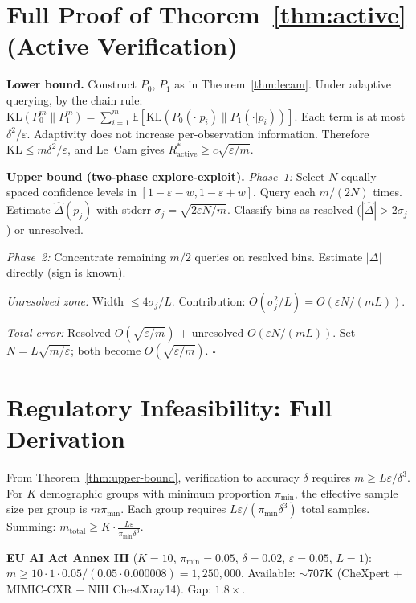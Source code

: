 \documentclass{article}
\newcommand{\Lip}{L}
\newcommand{\errrate}{\varepsilon}
\newcommand{\nsamples}{m}
\newcommand{\calmap}{\Delta}
\providecommand{\E}{}
\renewcommand{\E}{\mathbb{E}}
\providecommand{\KL}{}
\renewcommand{\KL}{\mathrm{KL}}
\newcommand{\activeR}{R^*_{\mathrm{active}}}
\newcommand{\groupprop}{\pi}
\newcommand{\targetacc}{\delta}
\theoremstyle{definition}
\begin{document}
\section{Full Proof of Theorem~\ref{thm:active} (Active Verification)}
\label{app:active-proof}

\textbf{Lower bound.} Construct $P_0$, $P_1$ as in Theorem~\ref{thm:lecam}. Under adaptive querying, by the chain rule:
$\KL(P_0^\nsamples \| P_1^\nsamples) = \sum_{i=1}^\nsamples \E[\KL(P_0(\cdot|p_i) \| P_1(\cdot|p_i))]$.
Each term is at most $\targetacc^2/\errrate$. Adaptivity does not increase per-observation information. Therefore $\KL \leq \nsamples\targetacc^2/\errrate$, and Le~Cam gives $\activeR \geq c\sqrt{\errrate/\nsamples}$.

\textbf{Upper bound (two-phase explore-exploit).}
\emph{Phase~1:} Select $N$ equally-spaced confidence levels in $[1{-}\errrate{-}w, 1{-}\errrate{+}w]$. Query each $\nsamples/(2N)$ times. Estimate $\hat\calmap(p_j)$ with stderr $\sigma_j = \sqrt{2\errrate N/\nsamples}$. Classify bins as resolved ($|\hat\calmap| > 2\sigma_j$) or unresolved.

\emph{Phase~2:} Concentrate remaining $\nsamples/2$ queries on resolved bins. Estimate $|\calmap|$ directly (sign is known).

\emph{Unresolved zone:} Width $\leq 4\sigma_j/\Lip$. Contribution: $O(\sigma_j^2/\Lip) = O(\errrate N/(\nsamples\Lip))$.

\emph{Total error:} Resolved $O(\sqrt{\errrate/\nsamples})$ + unresolved $O(\errrate N/(\nsamples\Lip))$. Set $N = \Lip\sqrt{\nsamples/\errrate}$; both become $O(\sqrt{\errrate/\nsamples})$. $\square$

\section{Regulatory Infeasibility: Full Derivation}
\label{app:regulatory}

From Theorem~\ref{thm:upper-bound}, verification to accuracy $\targetacc$ requires $\nsamples \geq \Lip\errrate/\targetacc^3$. For $K$ demographic groups with minimum proportion $\groupprop_{\min}$, the effective sample size per group is $\nsamples\groupprop_{\min}$. Each group requires $\Lip\errrate/(\groupprop_{\min}\targetacc^3)$ total samples. Summing:
$\nsamples_{\mathrm{total}} \geq K \cdot \frac{\Lip\errrate}{\groupprop_{\min}\targetacc^3}$.

\textbf{EU AI Act Annex III} ($K{=}10$, $\groupprop_{\min}{=}0.05$, $\targetacc{=}0.02$, $\errrate{=}0.05$, $\Lip{=}1$): $\nsamples \geq 10 \cdot 1 \cdot 0.05 / (0.05 \cdot 0.000008) = 1{,}250{,}000$. Available: $\sim$707K (CheXpert + MIMIC-CXR + NIH ChestXray14). Gap: $1.8\times$.
\end{document}
